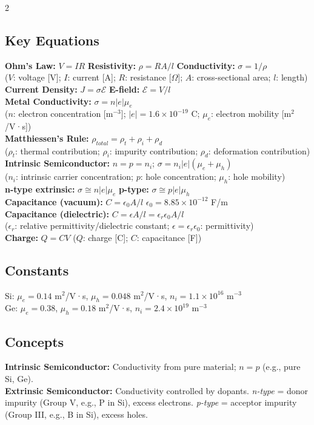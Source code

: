 \documentclass[8pt]{extarticle}
\begin{document}
\begin{multicols*}{2}
\subsection*{Key Equations}
\textbf{Ohm's Law:} $V=IR$ \quad \textbf{Resistivity:} $\rho=RA/l$ \quad \textbf{Conductivity:} $\sigma=1/\rho$ \\
($V$: voltage [V]; $I$: current [A]; $R$: resistance [$\Omega$]; $A$: cross-sectional area; $l$: length) \\
\textbf{Current Density:} $J=\sigma\mathcal{E}$ \quad \textbf{E-field:} $\mathcal{E}=V/l$ \\
\textbf{Metal Conductivity:} $\sigma=n|e|\mu_e$ \\
($n$: electron concentration [m$^{-3}$]; $|e|=1.6\times10^{-19}$ C; $\mu_e$: electron mobility [m$^2$/V·s]) \\
\textbf{Matthiessen's Rule:} $\rho_{total}=\rho_t+\rho_i+\rho_d$ \\
($\rho_t$: thermal contribution; $\rho_i$: impurity contribution; $\rho_d$: deformation contribution) \\
\textbf{Intrinsic Semiconductor:} $n=p=n_i$; \; $\sigma = n_i|e|(\mu_e+\mu_h)$ \\
($n_i$: intrinsic carrier concentration; $p$: hole concentration; $\mu_h$: hole mobility) \\
\textbf{n-type extrinsic:} $\sigma \cong n|e|\mu_e$ \quad \textbf{p-type:} $\sigma \cong p|e|\mu_h$ \\
\textbf{Capacitance (vacuum):} $C = \epsilon_0 A/l$ \quad $\epsilon_0=8.85\times10^{-12}$ F/m \\
\textbf{Capacitance (dielectric):} $C = \epsilon A/l = \epsilon_r \epsilon_0 A/l$ \\
($\epsilon_r$: relative permittivity/dielectric constant; $\epsilon=\epsilon_r\epsilon_0$: permittivity) \\
\textbf{Charge:} $Q=CV$ \quad ($Q$: charge [C]; $C$: capacitance [F])
\subsection*{Constants}
Si: $\mu_e=0.14$ m$^2$/V·s, $\mu_h=0.048$ m$^2$/V·s, $n_i=1.1\times10^{16}$ m$^{-3}$ \\
Ge: $\mu_e=0.38$, $\mu_h=0.18$ m$^2$/V·s, $n_i=2.4\times10^{19}$ m$^{-3}$
\subsection*{Concepts}
\textbf{Intrinsic Semiconductor:} Conductivity from pure material; $n=p$ (e.g., pure Si, Ge). \\
\textbf{Extrinsic Semiconductor:} Conductivity controlled by dopants. \textit{n-type} = donor impurity (Group V, e.g., P in Si), excess electrons. \textit{p-type} = acceptor impurity (Group III, e.g., B in Si), excess holes.

\end{multicols*}
\end{document}
